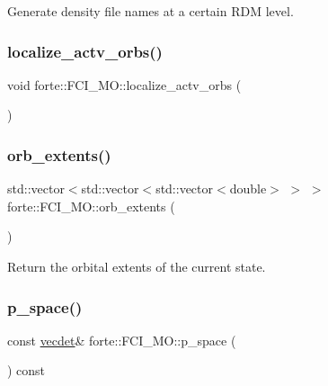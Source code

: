 Generate density file names at a certain R\+DM level. 

\mbox{\label{classforte_1_1_f_c_i___m_o_aa2bba8595c80cd0f1af47bddd0b94088}} 
\subsubsection{\texorpdfstring{localize\+\_\+actv\+\_\+orbs()}{localize\_actv\_orbs()}}
{\footnotesize\ttfamily void forte\+::\+F\+C\+I\+\_\+\+M\+O\+::localize\+\_\+actv\+\_\+orbs (\begin{DoxyParamCaption}{ }\end{DoxyParamCaption})\hspace{0.3cm}{\ttfamily [protected]}}

\mbox{\label{classforte_1_1_f_c_i___m_o_a91129e602986de474006b82c0764df5b}} 
\subsubsection{\texorpdfstring{orb\+\_\+extents()}{orb\_extents()}}
{\footnotesize\ttfamily std\+::vector$<$std\+::vector$<$std\+::vector$<$double$>$ $>$ $>$ forte\+::\+F\+C\+I\+\_\+\+M\+O\+::orb\+\_\+extents (\begin{DoxyParamCaption}{ }\end{DoxyParamCaption})\hspace{0.3cm}{\ttfamily [inline]}}



Return the orbital extents of the current state. 

\mbox{\label{classforte_1_1_f_c_i___m_o_a1c6e8fd8e4bcb8999665fa9ac17da1a0}} 
\subsubsection{\texorpdfstring{p\+\_\+space()}{p\_space()}}
{\footnotesize\ttfamily const \mbox{\hyperlink{fci__mo_8h_a777ccac2de1a8940d2f654e59ff12f06}{vecdet}}\& forte\+::\+F\+C\+I\+\_\+\+M\+O\+::p\+\_\+space (\begin{DoxyParamCaption}{ }\end{DoxyParamCaption}) const\hspace{0.3cm}{\ttfamily [inline]}}



